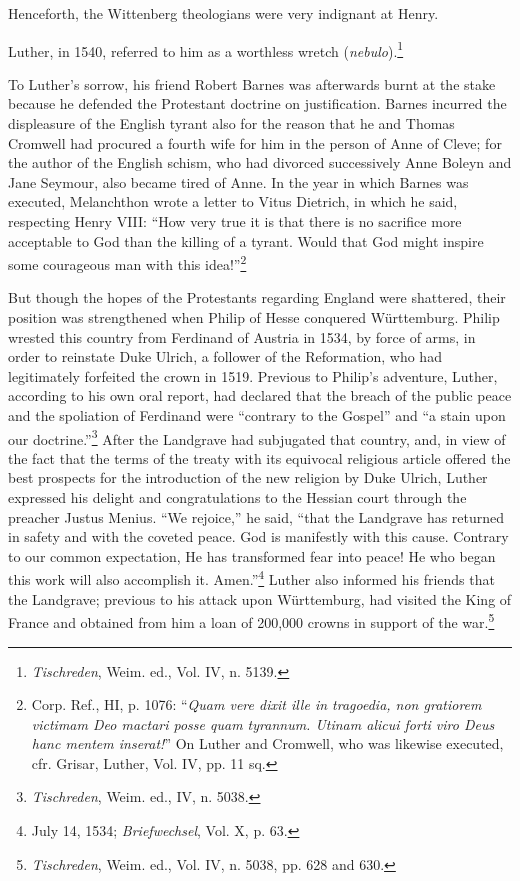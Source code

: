 Henceforth, the Wittenberg theologians were very indignant at
Henry.

Luther, in 1540, referred to him as a worthless wretch (\textit{nebulo}).\footnote{\textit{Tischreden}, Weim. ed., Vol. IV, n. 5139.}

To Luther’s sorrow, his friend Robert Barnes was afterwards burnt at the stake
because he defended the Protestant doctrine on justification. Barnes incurred
the displeasure of the English tyrant also for the reason that he and Thomas
Cromwell had procured a fourth wife for him in the person of Anne of
Cleve; for the author of the English schism, who had divorced successively
Anne Boleyn and Jane Seymour, also became tired of Anne. In the year in
which Barnes was executed, Melanchthon wrote a letter to Vitus Dietrich,
in which he said, respecting Henry VIII: “How very true it is that there is
no sacrifice more acceptable to God than the killing of a tyrant. Would
that God might inspire some courageous man with this idea!”\footnote
{Corp. Ref., HI, p. 1076: “\textit{Quam vere dixit ille in tragoedia, non gratiorem victimam
Deo mactari posse quam tyrannum. Utinam alicui forti viro Deus hanc mentem inserat!}”
On Luther and Cromwell, who was likewise executed, cfr. Grisar, Luther, Vol. IV, pp.
11 sq.}

But though the hopes of the Protestants regarding England were
shattered, their position was strengthened when Philip of Hesse
conquered Württemburg. Philip wrested this country from Ferdinand
of Austria in 1534, by force of arms, in order to reinstate Duke
Ulrich, a follower of the Reformation, who had legitimately forfeited
the crown in 1519. Previous to Philip’s adventure, Luther, according
to his own oral report, had declared that the breach of the public
peace and the spoliation of Ferdinand were “contrary to the Gospel”
and “a stain upon our doctrine.”\footnote{\textit{Tischreden}, Weim. ed., IV, n. 5038.}
 After the Landgrave had subjugated
that country, and, in view of the fact that the terms of the
treaty with its equivocal religious article offered the best prospects
for the introduction of the new religion by Duke Ulrich, Luther
expressed his delight and congratulations to the Hessian court through
the preacher Justus Menius. “We rejoice,” he said, “that the Landgrave
has returned in safety and with the coveted peace. God is
manifestly with this cause. Contrary to our common expectation,
He has transformed fear into peace! He who began this work will
also accomplish it. Amen.”\footnote{July 14, 1534; \textit{Briefwechsel}, Vol. X, p. 63.}
 Luther also informed his friends that
the Landgrave; previous to his attack upon Württemburg, had visited
the King of France and obtained from him a loan of 200,000 crowns
in support of the war.\footnote{\textit{Tischreden}, Weim. ed., Vol. IV, n. 5038, pp. 628 and 630.}

